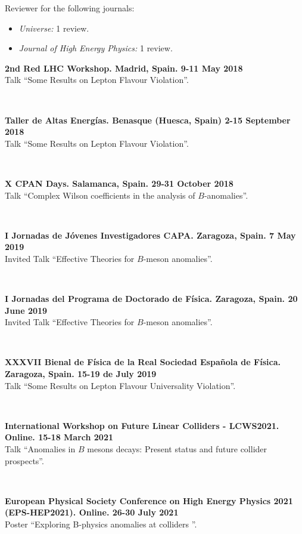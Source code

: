 \documentclass{cvf}
\begin{document}
\hspace{\parindent}Reviewer for the following journals:
\begin{itemize}
    \item \textit{Universe:} 1 review.
    \item \textit{Journal of High Energy Physics:} 1 review.
\end{itemize}


\hspace{\parindent}\textbf{2nd Red LHC Workshop. Madrid, Spain. 9-11 May 2018}\\
Talk ``Some Results on Lepton Flavour Violation''.

~

\textbf{Taller de Altas Energías. Benasque (Huesca, Spain) 2-15 September 2018}\\
Talk ``Some Results on Lepton Flavour Violation''.

~

\textbf{X CPAN Days. Salamanca, Spain. 29-31 October 2018}\\
Talk ``Complex Wilson coefficients in the analysis of $B$-anomalies''.

~

\textbf{I Jornadas de Jóvenes Investigadores CAPA. Zaragoza, Spain. 7 May 2019}\\
Invited Talk ``Effective Theories for $B$-meson anomalies''.

~

\textbf{I Jornadas del Programa de Doctorado de Física. Zaragoza, Spain. 20 June 2019}\\
Invited Talk ``Effective Theories for $B$-meson anomalies''.

~

\textbf{XXXVII Bienal de Física de la Real Sociedad Española de Física. Zaragoza, Spain. 15-19 de July 2019}\\
Talk ``Some Results on Lepton Flavour Universality Violation''.

~

\textbf{International Workshop on Future Linear Colliders - LCWS2021. Online. 15-18 March 2021}\\
Talk ``Anomalies in $B$ mesons decays: Present status and future collider prospects''.

~

\textbf{European Physical Society Conference on High Energy Physics 2021 (EPS-HEP2021). Online. 26-30 July 2021}\\
Poster ``Exploring B-physics anomalies at colliders ''.
\end{document}
